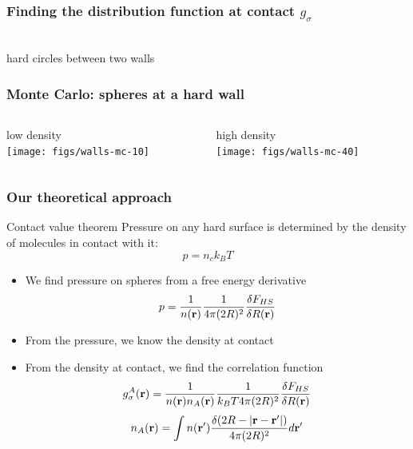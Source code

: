 \begin{frame}
  \frametitle{Finding the distribution function at contact $g_\sigma$}
  \vspace{-0.8em}
  \begin{center}
    \\
    \vspace{-2.0em}
    hard circles between two walls
  \end{center}
\end{frame}

\begin{frame}
  \frametitle{Monte Carlo:  spheres at a hard wall}
  \begin{columns}
    \begin{column}{0.5\columnwidth}
      \begin{center}
        low density\\
        \texttt{[image: figs/walls-mc-10]}
      \end{center}
    \end{column}
    \begin{column}{0.5\columnwidth}
      \begin{center}
        high density\\
        \texttt{[image: figs/walls-mc-40]}
      \end{center}
    \end{column}
  \end{columns}
\end{frame}

\begin{frame}
  \frametitle{Our theoretical approach}
  \begin{block}{Contact value theorem}
    Pressure on any hard surface is determined by the density of
    molecules in contact with it:
    \vspace{-1em}
    \[ p = n_{c}k_BT \]
    \vspace{-2em}
    \begin{itemize}
    \item We find pressure on spheres from a free energy derivative
      \vspace{-0.5em}
      \[p = \frac{1}{n(\mathbf{r})}\frac{1}{4\pi(2R)^2}\frac{\delta F_{HS}}{\delta R(\mathbf{r})}\]
    \item From the pressure, we know the density at contact
    \item From the density at contact, we find the correlation
      function
      \vspace{-0.5em}
      \[g_\sigma^A(\mathbf{r})
      = \frac{1}{n(\mathbf{r}) n_A(\mathbf{r})}\frac{1}{ k_BT 4\pi (2R)^2} \frac{\delta
        F_{HS}}{\delta R(\mathbf{r})}\]
      \[
      n_A(\mathbf{r}) = \int n(\mathbf{r}')
      \frac{\delta(2R -|\mathbf{r}-\mathbf{r}'|)}{4\pi(2R)^2} d\mathbf{r}' \label{eq:nA}
      \]
    \end{itemize}
  \end{block}
\end{frame}

